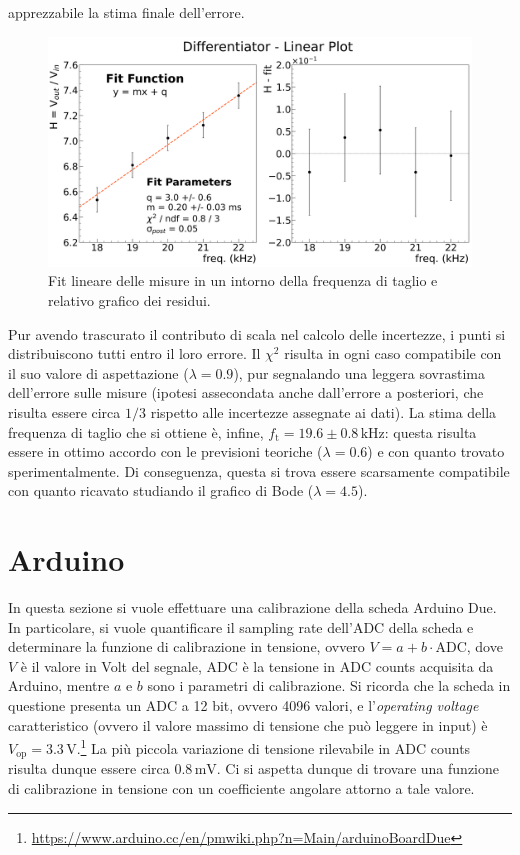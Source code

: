 \documentclass[a4paper,11pt]{article} %
\begin{document}
apprezzabile la stima finale dell'errore.
\begin{figure}[H]
	\centering
	\includegraphics[width=15cm]{../Plots/Report_Plots/diff_lin_bode.png}
	\caption{\small Fit lineare delle misure in un intorno della frequenza di taglio e relativo grafico dei residui.}
	\label{i:diff_linear}
\end{figure}
\noindent Pur avendo trascurato il contributo di scala nel calcolo delle incertezze, i punti si distribuiscono tutti
entro il loro errore. Il $\chi^2$ risulta in ogni caso compatibile con il suo valore di aspettazione ($\lambda = 0.9$),
pur segnalando una leggera sovrastima dell'errore sulle misure (ipotesi assecondata anche dall'errore a posteriori,
che risulta essere circa $1/3$ rispetto alle incertezze assegnate ai dati). La stima della frequenza di taglio che si
ottiene è, infine, $f_{\text{t}} = 19.6\pm 0.8\,\si{\kHz}$: questa risulta essere in ottimo accordo con le previsioni
teoriche ($\lambda=0.6$) e con quanto trovato sperimentalmente. Di conseguenza, questa si trova essere scarsamente
compatibile con quanto ricavato studiando il grafico di Bode ($\lambda = 4.5$).



\section{Arduino}
In questa sezione si vuole effettuare una calibrazione della scheda Arduino Due. In particolare, si vuole quantificare
il sampling rate dell'ADC della scheda e determinare la funzione di calibrazione in tensione, ovvero $V = a + b \cdot
\text{ADC}$, dove $V$ è il valore in Volt del segnale, $\text{ADC}$ è la tensione in ADC counts acquisita da Arduino,
mentre $a$ e $b$ sono i parametri di calibrazione. Si ricorda che la scheda in questione presenta un ADC a 12 bit,
ovvero 4096 valori, e l'\textit{operating voltage} caratteristico (ovvero il valore massimo di tensione che può leggere
in input) è $V_{\text{op}}=3.3\,\si{\volt}$.\footnote{\url{https://www.arduino.cc/en/pmwiki.php?n=Main/arduinoBoardDue}}
La più piccola variazione di tensione rilevabile in ADC counts risulta dunque essere circa $0.8\,\si{\mV}$. Ci si
aspetta dunque di trovare una funzione di calibrazione in tensione con un coefficiente angolare attorno a tale valore. 
\end{document}
